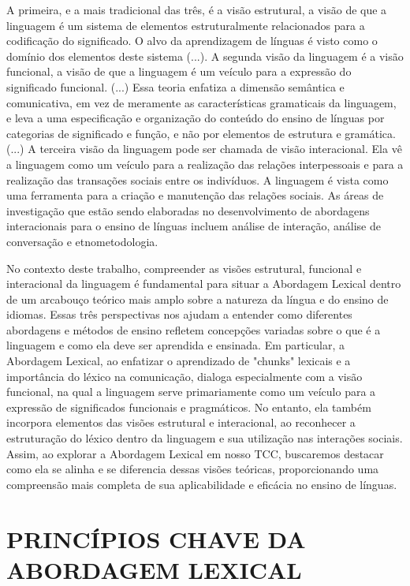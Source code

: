 \begin{citar}
A primeira, e a mais tradicional das três, é a visão estrutural, a visão de que a linguagem é um sistema de elementos estruturalmente relacionados para a codificação do significado. O alvo da aprendizagem de línguas é visto como o domínio dos elementos deste sistema (...). A segunda visão da linguagem é a visão funcional, a visão de que a linguagem é um veículo para a expressão do significado funcional. (...) Essa teoria enfatiza a dimensão semântica e comunicativa, em vez de meramente as características gramaticais da linguagem, e leva a uma especificação e organização do conteúdo do ensino de línguas por categorias de significado e função, e não por elementos de estrutura e gramática. (...) A terceira visão da linguagem pode ser chamada de visão interacional. Ela vê a linguagem como um veículo para a realização das relações interpessoais e para a realização das transações sociais entre os indivíduos. A linguagem é vista como uma ferramenta para a criação e manutenção das relações sociais. As áreas de investigação que estão sendo elaboradas no desenvolvimento de abordagens interacionais para o ensino de línguas incluem análise de interação, análise de conversação e etnometodologia. \cite{richards2001}
\end{citar}

No contexto deste trabalho, compreender as visões estrutural, funcional e interacional da linguagem é fundamental para situar a Abordagem Lexical dentro de um arcabouço teórico mais amplo sobre a natureza da língua e do ensino de idiomas. Essas três perspectivas nos ajudam a entender como diferentes abordagens e métodos de ensino refletem concepções variadas sobre o que é a linguagem e como ela deve ser aprendida e ensinada. Em particular, a Abordagem Lexical, ao enfatizar o aprendizado de "chunks" lexicais e a importância do léxico na comunicação, dialoga especialmente com a visão funcional, na qual a linguagem serve primariamente como um veículo para a expressão de significados funcionais e pragmáticos. No entanto, ela também incorpora elementos das visões estrutural e interacional, ao reconhecer a estruturação do léxico dentro da linguagem e sua utilização nas interações sociais. Assim, ao explorar a Abordagem Lexical em nosso TCC, buscaremos destacar como ela se alinha e se diferencia dessas visões teóricas, proporcionando uma compreensão mais completa de sua aplicabilidade e eficácia no ensino de línguas.

\section{PRINCÍPIOS CHAVE DA ABORDAGEM LEXICAL}

